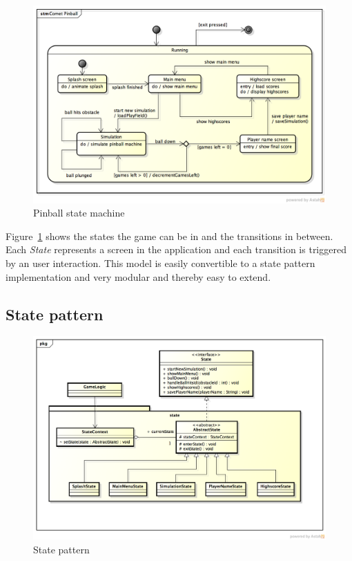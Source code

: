 \documentclass[fontsize=12pt,
               paper=a4,
               twoside=false,
               parskip=half,
               ]{scrartcl}
\begin{document}
\begin{figure}[H]
	\centering
	\includegraphics[width=15.5cm]{./img/state-machine.png}
	\caption[Pinball state machine]{Pinball state machine}
	\label{fig:state_machine}
\end{figure}

Figure~\ref{fig:state_machine} shows the states the game can be in and the transitions in between. Each \emph{State} represents a screen in the application and each transition is triggered by an user interaction. This model is easily convertible to a state pattern implementation and very modular and thereby  easy to extend.

\subsection{State pattern}

\begin{figure}[H]
	\centering
	\includegraphics[width=15.5cm]{./img/state-pattern.png}
	\caption[State pattern]{State pattern}
	\label{fig:state_pattern}
\end{figure}
\end{document}
